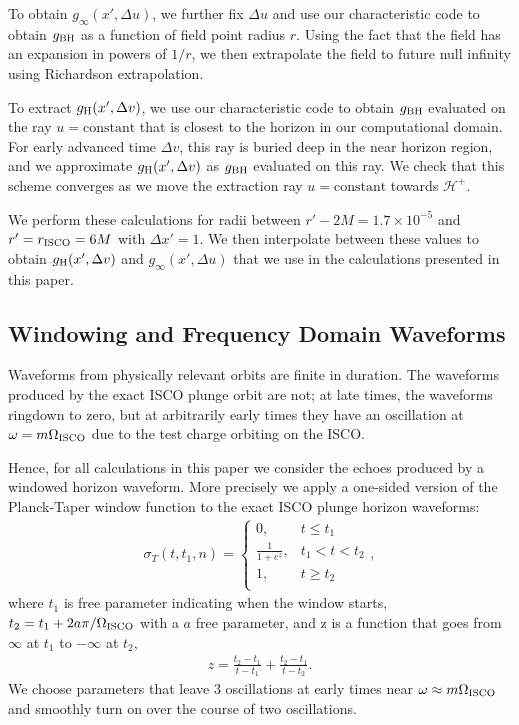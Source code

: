 \begin{refsection}
To obtain $g_\infty(x',\Delta u)$, we further fix $\Delta u$ and use our characteristic code to obtain $g_{\rm BH}$ as a function of field point radius $r$. 
Using the fact that the field has an expansion in powers of $1/r$, we then extrapolate the field to future null infinity using Richardson extrapolation.

To extract $g_{\rm H}(x',\Delta v)$, we  use our characteristic code to obtain $g_{\rm BH}$ evaluated on the ray $u= \text{constant}$ that is closest to the horizon in our computational domain. 
For early advanced time $\Delta v$, this ray is buried deep in the near horizon region, and we approximate $g_{\rm H}(x',\Delta v)$ as $g_{\rm BH}$ evaluated on this ray. 
We check that this scheme converges as we move the extraction ray $u= \text{constant}$ towards $\mathcal{H}^+$.

We perform these calculations for radii between $r'-2M =1.7\times 10^{-5}$ and $r' = r_{\rm ISCO} =6M$ with $\Delta x' =1$. 
We then interpolate between these values to obtain $g_{\rm H}(x',\Delta v)$ and $g_{\infty}(x',\Delta u)$ that we use in the calculations presented in this paper.

\subsection{Windowing and Frequency Domain Waveforms}
\label{sec:window}

Waveforms from physically relevant orbits are finite in duration. The waveforms produced by the exact ISCO plunge orbit are not; at late times, the waveforms ringdown to zero, but at arbitrarily early times they have an oscillation at $\omega = m\Omega_{\rm ISCO}$ due to the test charge orbiting on the ISCO. 

Hence, for all calculations in this paper we consider the echoes produced by a windowed horizon waveform. More precisely we apply a one-sided version of the Planck-Taper \cite{McKechan:2010kp}  window function to the exact ISCO plunge horizon waveforms:
\begin{align}
\sigma_T(t, t_1, n) =\begin{cases}
0, & t\leq t_1 \\ 
\displaystyle
\frac{1}{1+e^{z}}, & t_1 < t <t_2\\
1, & t\geq t_2 \\ 
\end{cases},
\end{align}
where $t_1$ is free parameter indicating when the window starts, $t_2=t_1+ 2a \pi/\Omega_{\rm ISCO}$ with a $a$ free parameter, and z is a function that goes from $\infty$ at $t_1$ to $-\infty$ at $t_2$,
\begin{align}
z=\frac{t_2-t_1}{t-t_1}+\frac{t_2-t_1}{t-t_2}.
\end{align}
We choose parameters that leave 3 oscillations at early times near $\omega \approx m\Omega_{\rm ISCO}$ and smoothly turn on over the course of two oscillations.


\end{refsection}
